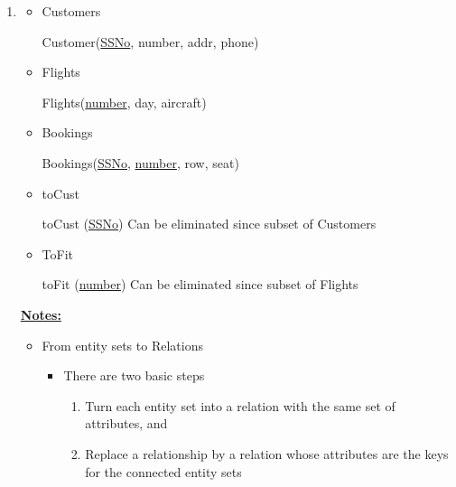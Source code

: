 \documentclass[12pt]{article}
\begin{document}
\begin{enumerate}[1.]
\begin{enumerate}[a)]
    \end{enumerate}

    \item

    \bigskip

    \begin{itemize}
        \item Customers

        \bigskip

        Customer(\underline{SSNo}, number, addr, phone)

        \bigskip

        \item Flights

        \bigskip

        Flights(\underline{number}, day, aircraft)

        \bigskip

        \item Bookings

        \bigskip

        Bookings(\underline{SSNo}, \underline{number}, row, seat)

        \bigskip

        \item toCust

        \bigskip

        toCust (\underline{SSNo}) \color{red}Can be eliminated since subset of Customers\color{black}

        \bigskip

        \item ToFit

        \bigskip

        toFit (\underline{number}) \color{red}Can be eliminated since subset of Flights\color{black}

        \bigskip
    \end{itemize}

    \bigskip

    \underline{\textbf{Notes:}}

    \bigskip

    \begin{itemize}
        \item From entity sets to Relations
        \begin{itemize}
            \item There are two basic steps

            \begin{enumerate}[1.]
                \item Turn each entity set into a relation with the same set of attributes, and
                \item Replace a relationship by a relation whose attributes are the keys for
                the connected entity sets


\end{enumerate}
\end{itemize}
\end{itemize}
\end{enumerate}
\end{document}

